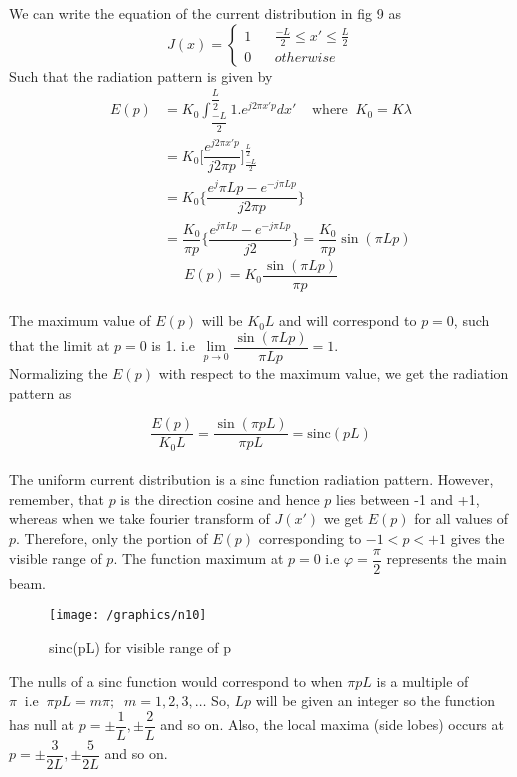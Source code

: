 We can write the equation of the current distribution in fig 9 as
\begin{equation*}
J(x) =
\begin{cases}
1 \ \ \ \ & \frac{-L}{2}\le x' \le \frac{L}{2} \\
0  & otherwise
\end{cases}
\end{equation*}
Such that the radiation pattern is given by 
\begin{align*}
E(p) &= K_0\int_{\dfrac{-L}{2}}^{\dfrac{L}{2}} 1.e^{j2\pi x'p }dx' \; \; \; \;\text{where}\; \;  K_0 = K\lambda\\ %
&= K_0\bigg[\dfrac{e^{j2\pi x'p}}{j2\pi p}\bigg]_{\frac{-L}{2}}^{ \frac{L}{2}}\\	  
&= K_0 \bigg\{\dfrac{ e{^j\pi Lp}- e^{-j\pi Lp}}{j2\pi p}\bigg\}\\
& = \dfrac{K_0}{\pi p}\bigg\{\dfrac{ e^{j\pi Lp} -  e^{-j\pi Lp}}{j2}\bigg\} = \dfrac{K_0}{\pi p}\sin(\pi Lp)
\end{align*}
$$E(p) = K_0 \dfrac{\sin (\pi Lp)}{\pi p}$$\\
The maximum value of $E(p)$ will be $K_0L$ and will correspond to $ p = 0$, such that the limit at $p = 0$ is 1. i.e $\lim\limits_{p\rightarrow0} \dfrac{\sin(\pi Lp)}{\pi Lp} = 1$.\\
Normalizing the $E(p)$ with respect to the maximum value, we get the radiation pattern as

\begin{equation}
\dfrac{E(p)}{K_0 L} = \dfrac{\sin(\pi pL)}{\pi pL} = \text{sinc}(pL)
\end{equation}
\\
The uniform current distribution is a sinc function radiation pattern. However, remember, that $p$ is the direction cosine and hence $p$ lies between -1 and +1, whereas when we take fourier transform of $J(x')$ we get $E(p)$ for all values of $p$. Therefore, only the portion of $E(p)$ corresponding to $-1 < p < +1$ gives the visible range of $p$. The function maximum at $p = 0$ i.e $\varphi = \dfrac{\pi}{2}$ represents the main beam.

\begin{figure}[h]
\centering
\texttt{[image: /graphics/n10]}
\caption{sinc(pL) for visible range of p}
\label{fig10}
\end{figure}

The nulls of a sinc function would correspond to when $\pi pL$ is a multiple of $\pi \; \; \text{i.e} \; \; \pi pL = m\pi ; \; \; m = 1, 2, 3, \ldots$ So, $Lp$ will be given an integer so the function has null at $p = \pm\dfrac{1}{L}, \pm\dfrac{2}{L}$ and so on. Also, the local maxima (side lobes) occurs at $p = \pm\dfrac{3}{2L}, \pm\dfrac{5}{2L}$ and so on.

